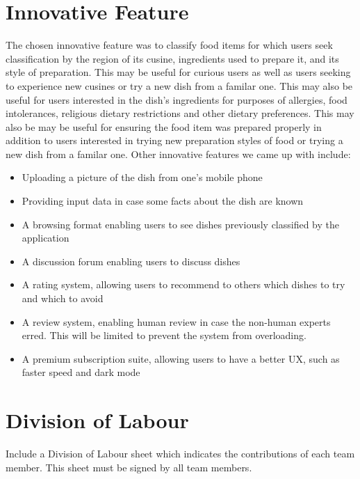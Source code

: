 \documentclass[]{article}
\begin{document}


\section{Innovative Feature}

The chosen innovative feature was to classify food items for which users seek classification by the region of its cusine,
ingredients used to prepare it, and its style of preparation. This may be useful for curious users as well as users seeking 
to experience new cusines or try a new dish from a familar one. This may also be useful for users interested in the dish's ingredients
for purposes of allergies, food intolerances, religious dietary restrictions and other dietary preferences. This may
also be may be useful for ensuring the food item was prepared properly in addition to users interested in trying new
preparation styles of food or trying a new dish from a familar one. Other innovative features we came up with include:

\begin{itemize}
	\item Uploading a picture of the dish from one's mobile phone
	\item Providing input data in case some facts about the dish are known
	\item A browsing format enabling users to see dishes previously classified by the application
	\item A discussion forum enabling users to discuss dishes
	\item A rating system, allowing users to recommend to others which dishes to try and which to avoid
	\item A review system, enabling human review in case the non-human experts erred. This will be limited to prevent
	the system from overloading.
	\item A premium subscription suite, allowing users to have a better UX, such as faster speed and dark mode
\end{itemize}

\appendix
\section{Division of Labour}
\label{sec:division_of_labour}
Include a Division of Labour sheet which indicates the contributions of each team member. This sheet must be signed by all team members.
\end{document}
